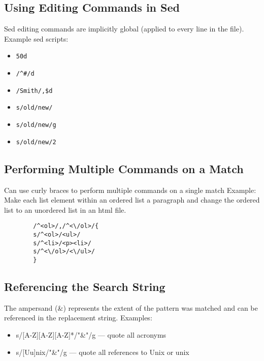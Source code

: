 \documentclass[12pt]{article}
\begin{document}
    \subsection{Using Editing Commands in Sed}
    Sed editing commands are implicitly global (applied to every line in the file).
    Example sed scripts:
    \begin{itemize}
        \item \begin{verbatim}50d\end{verbatim}
        \item \begin{verbatim}/^#/d\end{verbatim}
        \item \begin{verbatim}/Smith/,$d\end{verbatim}
        \item \begin{verbatim}s/old/new/\end{verbatim}
        \item \begin{verbatim}s/old/new/g\end{verbatim}
        \item \begin{verbatim}s/old/new/2\end{verbatim}
    \end{itemize}

    \subsection{Performing Multiple Commands on a Match}
    Can use curly braces to perform multiple commands on a single match
    Example: Make each list element within an ordered list a paragraph and change the 
    ordered list to an unordered list in an html file.
    \begin{verbatim}
        /^<ol>/,/^<\/ol>/{
        s/^<ol>/<ul>/
        s/^<li>/<p><li>/
        s/^<\/ol>/<\/ul>/
        }
    \end{verbatim}

    \subsection{Referencing the Search String}
    The ampersand (\&) represents the extent of the pattern was matched and can be
    referenced in the replacement string.
    Examples:
    \begin{itemize}
        \item s/[A-Z][A-Z][A-Z]*/"\&"/g --- quote all acronyms
        \item s/[Uu]nix/"\&"/g --- quote all references to Unix or unix
    \end{itemize}
\end{document}
